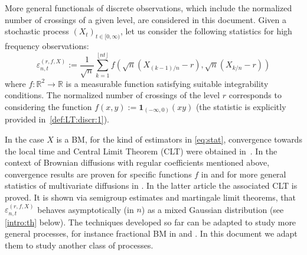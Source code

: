\documentclass[12pt]{article}
\numberwithin{equation}{section}
\theoremstyle{definition}
\theoremstyle{remark}
\newcommand{\RR}{\mathbb{R}}
\newcommand{\ind}[1]{\mathbf{1}_{#1}}
\begin{document}
More general functionals of discrete observations, which include the normalized number of crossings of a given level, are considered in this document. 
Given a stochastic process 
$(X_t)_{t\in [0,\infty)}$, let us consider the following statistics for high frequency observations:
\begin{equation} \label{eq:stat}
	\varepsilon_{n,t}^{(r,f,X)}:=\frac{1}{\sqrt{n}} \sum_{k=1}^{\lfloor n t \rfloor} f(\sqrt{n}(X_{(k-1)/n}-r),\sqrt{n}(X_{k/n}-r)) 
\end{equation}
where $f\colon \RR^2 \to \RR$ is a measurable function satisfying suitable integrability conditions.
The normalized number of crossings of the level $r$ corresponds to considering the function $f(x,y):= \ind{(-\infty,0)}(xy)$ (the statistic is explicitly provided in~\eqref{def:LT:discr:1}).

In the case $X$ is a BM, for the kind of estimators in \eqref{eq:stat}, convergence towards the local time and Central Limit Theorem (CLT) were obtained in~\cite{borodin86,borodin89}.
In the context of Brownian diffusions with regular coefficients mentioned above, convergence results are proven for specific functions $f$ in \cite{florens-zmirou} 
and for more general statistics of multivariate diffusions in \cite{j1}. In the latter article the associated CLT is proved.  
It is shown via semigroup estimates and martingale limit theorems,
that $\varepsilon_{n,t}^{(r,f,X)}$ behaves asymptotically (in $n$) as a mixed Gaussian distribution (see \eqref{intro:th} below).
The techniques developed so far can be adapted to study more general processes, for instance fractional BM in \cite{podolskij2017comment} and \cite[Corollary~14]{altmeyer2017estimating}.
In this document we adapt them to study another class of processes.
\end{document}
